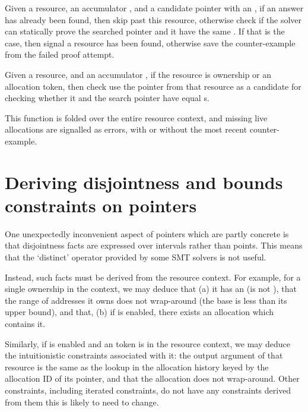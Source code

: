 
Given a resource, an accumulator , and a candidate pointer
with an  , if an answer has already been
found, then skip past this resource, otherwise check if the solver can
statically prove the searched pointer  and it have the same
\@. If that is the case, then signal a resource has been found,
otherwise save the counter-example from the failed proof attempt.


Given a resource, and an accumulator , if the resource is
ownership or an allocation token, then check use the pointer from that resource
as a candidate for checking whether it and the search pointer have equal
s.


This function is folded over the entire resource context, and missing live
allocations are signalled as errors, with or without the most recent
counter-example.


\section{Deriving disjointness and bounds constraints on pointers}

One unexpectedly inconvenient aspect of pointers which are partly concrete is
that disjointness facts are expressed over intervals rather than points. This
means that the `distinct' operator provided by some SMT solvers is not
useful.

Instead, such facts must be derived from the resource context. For
example, for a single ownership in the context, we may deduce that (a) it has
an  (is not ), that the range of addresses it
owns does not wrap-around (the base is less than its upper bound), and that, (b) if
 is enabled, there exists an allocation which contains it.


Similarly, if  is enabled and an  token is in the
resource context, we may deduce the intuitionistic constraints associated with
it: the output argument of that resource is the same as the lookup in the
 allocation history keyed by the allocation ID of its pointer,
and that the allocation does not wrap-around. Other constraints, including iterated
constraints, do not have any constraints derived from them \textemdash{} this is
likely to need to
change.

